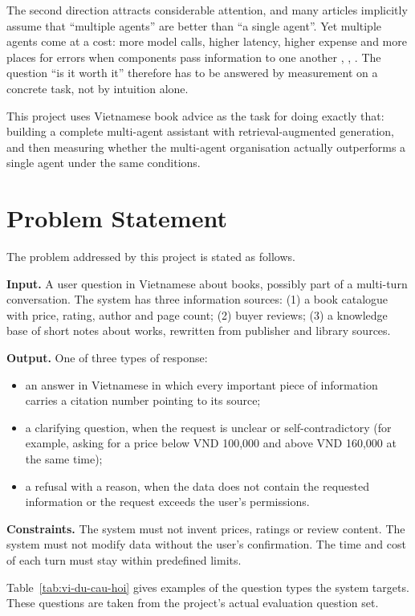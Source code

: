 The second direction attracts considerable attention, and many articles implicitly assume that ``multiple agents'' are better than ``a single agent''. Yet multiple agents come at a cost: more model calls, higher latency, higher expense and more places for errors when components pass information to one another , , . The question ``is it worth it'' therefore has to be answered by measurement on a concrete task, not by intuition alone.

This project uses Vietnamese book advice as the task for doing exactly that: building a complete multi-agent assistant with retrieval-augmented generation, and then measuring whether the multi-agent organisation actually outperforms a single agent under the same conditions.

\section{Problem Statement}

The problem addressed by this project is stated as follows.

\textbf{Input.} A user question in Vietnamese about books, possibly part of a multi-turn conversation. The system has three information sources: (1) a book catalogue with price, rating, author and page count; (2) buyer reviews; (3) a knowledge base of short notes about works, rewritten from publisher and library sources.

\textbf{Output.} One of three types of response:
\begin{itemize}
    \item an answer in Vietnamese in which every important piece of information carries a citation number pointing to its source;
    \item a clarifying question, when the request is unclear or self-contradictory (for example, asking for a price below VND 100,000 and above VND 160,000 at the same time);
    \item a refusal with a reason, when the data does not contain the requested information or the request exceeds the user's permissions.
\end{itemize}

\textbf{Constraints.} The system must not invent prices, ratings or review content. The system must not modify data without the user's confirmation. The time and cost of each turn must stay within predefined limits.

Table~\ref{tab:vi-du-cau-hoi} gives examples of the question types the system targets. These questions are taken from the project's actual evaluation question set.

